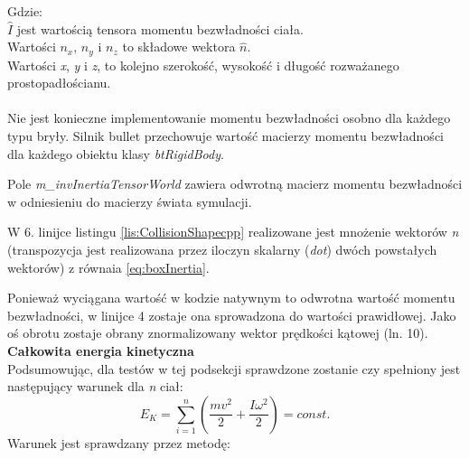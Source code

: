 Gdzie:\\
$\hat{I}$ jest wartością tensora momentu bezwładności ciała.\\
Wartości $n_{x}$, $n_{y}$ i $n_{z}$ to składowe wektora $\hat{n}$.\\
Wartości \emph{x}, \emph{y} i \emph{z}, to kolejno szerokość, wysokość i długość
rozważanego prostopadłościanu.\\ \\
Nie jest konieczne implementowanie momentu bezwładności osobno dla każdego typu
bryły. Silnik bullet przechowuje wartość macierzy momentu bezwładności dla
każdego obiektu klasy \emph{btRigidBody}.



Pole \emph{m\_invInertiaTensorWorld} zawiera odwrotną macierz momentu
bezwładności w odniesieniu do macierzy świata symulacji.



W 6. linijce listingu \ref{lis:CollisionShapecpp} realizowane jest mnożenie wektorów
\emph{n} (transpozycja jest realizowana przez iloczyn skalarny (\emph{dot})
dwóch powstałych wektorów) z równaia \ref{eq:boxInertia}.



Ponieważ wyciągana wartość w kodzie natywnym to odwrotna wartość momentu
bezwładności, w linijce 4 zostaje ona sprowadzona do wartości prawidłowej. Jako
oś obrotu zostaje obrany znormalizowany wektor prędkości kątowej (ln. 10).\\


\textbf{Całkowita energia kinetyczna}\\
Podsumowując, dla testów w tej podsekcji sprawdzone zostanie czy spełniony
jest następujący warunek dla \emph{n} ciał:
\begin{equation}
E_{K} = \sum_{i=1}^{n}\left(\frac{mv^{2}}{2} + \frac{I\omega^{2}}{2}\right) =
const.
\end{equation}
Warunek jest sprawdzany przez metodę:




